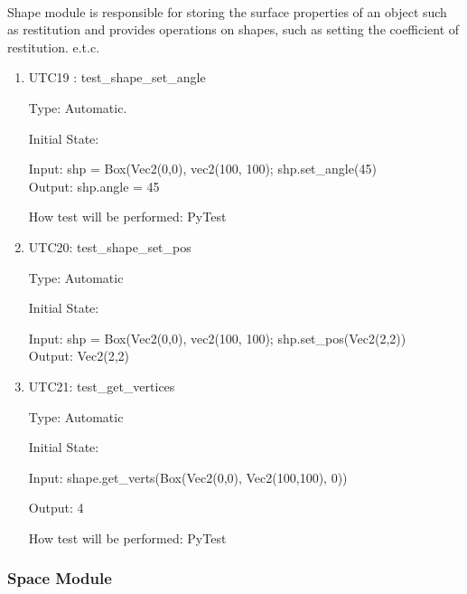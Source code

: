 \documentclass[12pt, titlepage]{article}
\begin{document}
\paragraph{}
Shape module is responsible for storing the surface properties of an object such as restitution and provides operations on shapes, such as setting the coefficient of restitution. e.t.c.
\begin{enumerate}
	
	
	\item{UTC19} {: test\_shape\_set\_angle \\}
	
	Type: Automatic.
	
	Initial State: 
	
	Input: shp = Box(Vec2(0,0), vec2(100, 100); 
	             shp.set\_angle(45)\\
	
	Output: shp.angle = 45
	
	How test will be performed: PyTest 
	
	\item{UTC20}{: test\_shape\_set\_pos\\}
	
	Type: Automatic
	
	Initial State: 
	
	Input: shp = Box(Vec2(0,0), vec2(100, 100);
	             shp.set\_pos(Vec2(2,2))\\
	
	Output: Vec2(2,2)
	
	\item{UTC21}{: test\_get\_vertices\\}
	
	Type: Automatic
	
	Initial State: 
	
	Input: shape.get\_verts(Box(Vec2(0,0), Vec2(100,100), 0)) 
	
	Output: 4
	
	How test will be performed: PyTest
	

\end{enumerate}
\subsubsection{Space Module}
\end{document}
